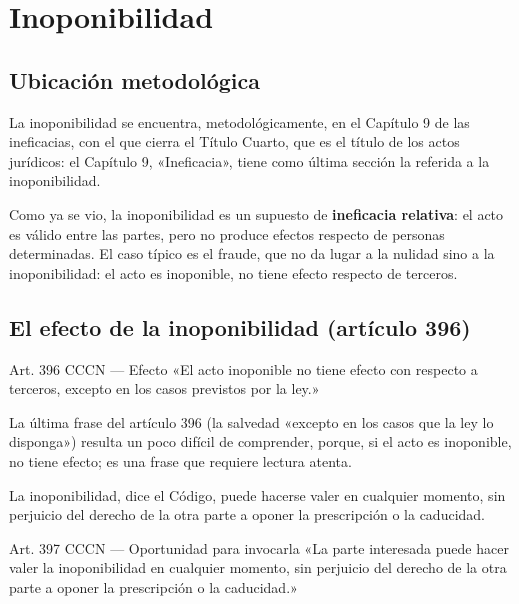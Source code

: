 \documentclass[12pt,oneside]{book}
\begin{document}
\chapter[Inoponibilidad]{Inoponibilidad}
\label{cap:inoponibilidad}

\section{Ubicación metodológica}

La inoponibilidad se encuentra, metodológicamente, en el Capítulo 9 de las ineficacias, con el que cierra el Título Cuarto, que es el título de los actos jurídicos: el Capítulo 9, «Ineficacia», tiene como última sección la referida a la inoponibilidad.

Como ya se vio, la inoponibilidad es un supuesto de \textbf{ineficacia relativa}: el acto es válido entre las partes, pero no produce efectos respecto de personas determinadas. El caso típico es el fraude, que no da lugar a la nulidad sino a la inoponibilidad: el acto es inoponible, no tiene efecto respecto de terceros.

\section{El efecto de la inoponibilidad (artículo 396)}

\begin{articulo}{Art. 396 CCCN --- Efecto}
«El acto inoponible no tiene efecto con respecto a terceros, excepto en los casos previstos por la ley.»
\end{articulo}

La última frase del artículo 396 (la salvedad «excepto en los casos que la ley lo disponga») resulta un poco difícil de comprender, porque, si el acto es inoponible, no tiene efecto; es una frase que requiere lectura atenta.

La inoponibilidad, dice el Código, puede hacerse valer en cualquier momento, sin perjuicio del derecho de la otra parte a oponer la prescripción o la caducidad.

\begin{articulo}{Art. 397 CCCN --- Oportunidad para invocarla}
«La parte interesada puede hacer valer la inoponibilidad en cualquier momento, sin perjuicio del derecho de la otra parte a oponer la prescripción o la caducidad.»
\end{articulo}
\end{document}
